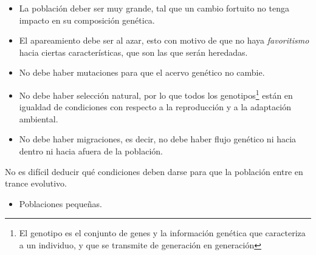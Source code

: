 \documentclass[letterpaper]{article}
\begin{document}
{{            \begin{itemize}
                \item {

                    \normalsize{La población deber ser muy grande, tal que un cambio fortuito no tenga impacto en su composición genética.}
                
                }

                \item {

                    \normalsize{El apareamiento debe ser al azar, esto con motivo de que no haya \textit{favoritismo} hacia ciertas características, que son las que serán heredadas.}
                
                }

                \item {

                    \normalsize{No debe haber mutaciones para que el acervo genético no cambie.}
                
                }

                \item {

                    \normalsize{No debe haber selección natural, por lo que todos los genotipos\footnote{El genotipo es el conjunto de genes y la información genética que caracteriza a un individuo, y que se transmite de generación en generación} están en igualdad de condiciones con respecto a la reproducción y a la adaptación ambiental.}
                
                }

                \item {

                    \normalsize{No debe haber migraciones, es decir, no debe haber flujo genético ni hacia dentro ni hacia afuera de la población.}
                
                }
            \end{itemize}

            \normalsize{No es difícil deducir qué condiciones deben darse para que la población entre en trance evolutivo.}

            \begin{itemize}
                \item {

                    \normalsize{Poblaciones pequeñas.}
                
                }


\end{itemize}}}
\end{document}

